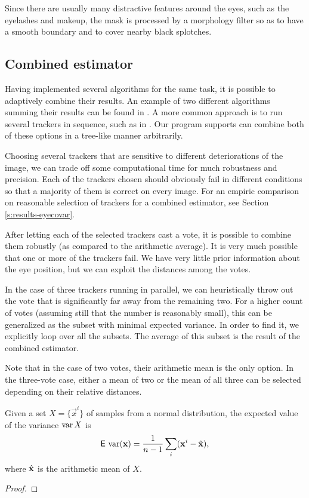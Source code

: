 Since there are usually many distractive features around the eyes, such as the eyelashes and makeup, the mask is processed by a morphology filter so as to have a smooth boundary and to cover nearby black splotches.

\subsection{Combined estimator}

Having implemented several algorithms for the same task, it is possible to adaptively combine their results.
An example of two different algorithms summing their results can be found in \cite{leo14}.
A more common approach is to run several trackers in sequence, such as in \cite{wang16,george16,zhu12}.
Our program supports can combine both of these options in a tree-like manner arbitrarily.

Choosing several trackers that are sensitive to different deteriorations of the image, we can trade off some computational time for much robustness and precision.
Each of the trackers chosen should obviously fail in different conditions so that a majority of them is correct on every image.
For an empiric comparison on reasonable selection of trackers for a combined estimator, see Section \ref{s:results-eyecovar}.

After letting each of the selected trackers cast a vote, it is possible to combine them robustly (as compared to the arithmetic average).
It is very much possible that one or more of the trackers fail.
We have very little prior information about the eye position, but we can exploit the distances among the votes.

In the case of three trackers running in parallel, we can heuristically throw out the vote that is significantly far away from the remaining two.
For a higher count of votes (assuming still that the number is reasonably small), this can be generalized as the subset with minimal expected variance.
In order to find it, we explicitly loop over all the subsets.
The average of this subset is the result of the combined estimator.

Note that in the case of two votes, their arithmetic mean is the only option.
In the three-vote case, either a mean of two or the mean of all three can be selected depending on their relative distances.

\begin{lemma}
Given a set $X = \{\vec x^i\}$ of samples from a normal distribution, the expected value of the variance $\operatorname{\mathrm{var}} X$ is
$$\operatorname{\textsf{E}\,}\operatorname{\mathrm{var}} (\mathbf{x}) = \frac 1 {n - 1} \sum_i (\mathbf{x}^i - \hat{\mathbf{x}}),$$
where $\hat{\mathbf{x}}$ is the arithmetic mean of $X$.
\end{lemma}
\begin{proof}
\end{proof}

